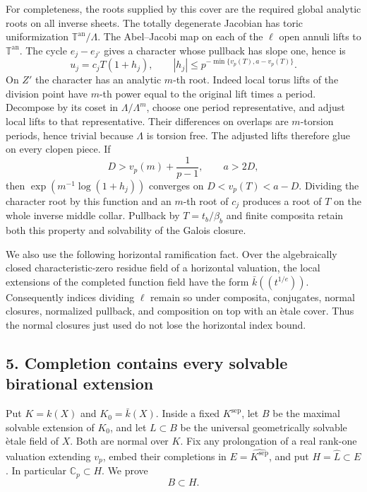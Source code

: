 For completeness, the roots supplied by this cover are the required
global analytic roots on all inverse sheets.  The totally degenerate
Jacobian has toric uniformization $\mathbb T^{\mathrm{an}}/\Lambda$.
The Abel--Jacobi map on each of the $\ell$ open annuli lifts to
$\mathbb T^{\mathrm{an}}$.  The cycle $e_j-e_{j'}$ gives a character
whose pullback has slope one, hence is
\[
                 u_j=c_j T(1+h_j),\qquad
        |h_j|\le p^{-\min\{v_p(T),a-v_p(T)\}}.
\]
On $Z'$ the character has an analytic $m$-th root.  Indeed local
torus lifts of the division point have $m$-th power equal to the
original lift times a period.  Decompose by its coset in
$\Lambda/\Lambda^m$, choose one period representative, and adjust
local lifts to that representative.  Their differences on overlaps
are $m$-torsion periods, hence trivial because $\Lambda$ is torsion
free.  The adjusted lifts therefore glue on every clopen piece.
If
\[
        D>v_p(m)+\frac1{p-1},\qquad a>2D,
\]
then $\exp(m^{-1}\log(1+h_j))$ converges on
$D<v_p(T)<a-D$.  Dividing the character root by this function and
an $m$-th root of $c_j$ produces a root of $T$ on the whole inverse
middle collar.  Pullback by $T=t_b/\beta_b$ and finite composita
retain both this property and solvability of the Galois closure.

We also use the following horizontal ramification fact.  Over the
algebraically closed characteristic-zero residue field of a
horizontal valuation, the local extensions of the completed
function field have the form $\bar k((t^{1/e}))$.  Consequently
indices dividing $\ell$ remain so under composita, conjugates,
normal closures, normalized pullback, and composition on top with
an \`etale cover.  Thus the normal closures just used do not lose
the horizontal index bound.

\subsection*{5. Completion contains every solvable birational extension}

Put $K=k(X)$ and $K_0=\bar k(X)$.  Inside a fixed $K^{\mathrm{sep}}$,
let $B$ be the maximal solvable extension of $K_0$, and let $L\subset B$
be the universal geometrically solvable \`etale field of $X$.
Both are normal over $K$.  Fix any prolongation of a real rank-one
valuation extending $v_p$, embed their completions in
$E=\widehat{K^{\mathrm{sep}}}$, and put $H=\widehat L\subset E$.
In particular $\mathbb C_p\subset H$.  We prove
\[
                              B\subset H.                 \tag{*}
\]

